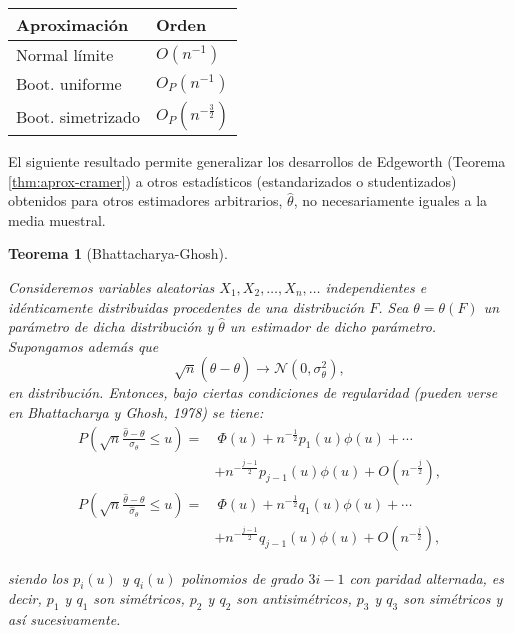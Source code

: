 \documentclass[
]{book}
\theoremstyle{break}
\newtheorem{theorem}{Teorema}[chapter]
\theoremstyle{definition}
\theoremstyle{definition}
\theoremstyle{definition}
\theoremstyle{definition}
\theoremstyle{remark}
\begin{document}
\begin{longtable}[]{@{}ll@{}}
\toprule
Aproximación & Orden \\
\midrule
\endhead
Normal límite & \(O\left( n^{-1} \right)\) \\
Boot. uniforme & \(O_{P}\left( n^{-1} \right)\) \\
Boot. simetrizado & \(O_{P}\left( n^{-\frac{3}{2}} \right)\) \\
\bottomrule
\end{longtable}

El siguiente resultado permite generalizar los desarrollos de Edgeworth
(Teorema \ref{thm:aprox-cramer})
a otros estadísticos (estandarizados o studentizados) obtenidos para
otros estimadores arbitrarios, \(\hat{\theta}\), no necesariamente iguales
a la media muestral.

\begin{theorem}[Bhattacharya-Ghosh]
\protect\hypertarget{thm:aprox-bhat-gho}{}{\label{thm:aprox-bhat-gho} \iffalse (Bhattacharya-Ghosh) \fi{} } \vspace{0.5cm}

Consideremos variables aleatorias
\(X_1,X_2,\ldots ,X_n,\ldots\) independientes e idénticamente
distribuidas procedentes de una distribución \(F\). Sea \(\theta =\theta \left( F \right)\) un parámetro de dicha distribución y \(\hat{\theta}\) un
estimador de dicho parámetro. Supongamos además
que\[\sqrt{n}\left( \hat{\theta}-\theta \right) \rightarrow \mathcal{N}\left( 0,\sigma
_{\theta }^2 \right),\]
en distribución. Entonces, bajo ciertas condiciones de regularidad
(pueden verse en Bhattacharya y Ghosh, 1978) se tiene:
\[\begin{aligned}
P\left( \sqrt{n}\frac{\hat{\theta}-\theta }{\sigma _{\theta }}\leq u \right)
= &\ \Phi \left( u \right) +n^{-\frac{1}{2}}p_1\left( u \right) \phi \left(
u \right) +\cdots \\
& +n^{-\frac{j-1}{2}}p_{j-1}\left( u \right) \phi \left( u \right) +O\left(
n^{-\frac{j}{2}} \right), \\
P\left( \sqrt{n}\frac{\hat{\theta}-\theta }{\hat{\sigma}_{\theta }}\leq
u \right) = &\ \Phi \left( u \right) +n^{-\frac{1}{2}}q_1\left( u \right) \phi
\left( u \right) +\cdots \\
& +n^{-\frac{j-1}{2}}q_{j-1}\left( u \right) \phi \left( u \right) +O\left(
n^{-\frac{j}{2}} \right),\end{aligned}\]

siendo los \(p_i\left( u \right)\) y \(q_i\left( u \right)\) polinomios
de grado \(3i-1\) con paridad alternada, es decir, \(p_1\) y \(q_1\) son
simétricos, \(p_2\) y \(q_2\) son antisimétricos, \(p_3\) y \(q_3\) son
simétricos y así sucesivamente.
\end{theorem}
\end{document}

